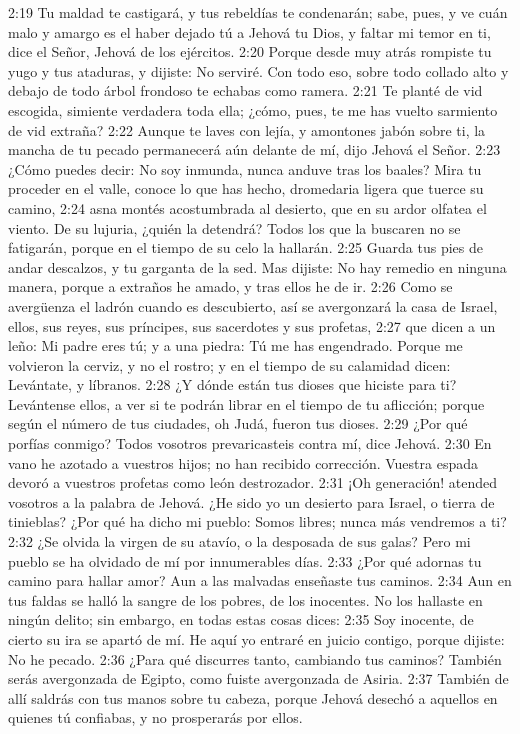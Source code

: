 2:19 Tu maldad te castigará, y tus rebeldías te condenarán; sabe, pues, y ve cuán malo y amargo es el haber dejado tú a Jehová tu Dios, y faltar mi temor en ti, dice el Señor, Jehová de los ejércitos.  
2:20 Porque desde muy atrás rompiste tu yugo y tus ataduras, y dijiste: No serviré. Con todo eso, sobre todo collado alto y debajo de todo árbol frondoso te echabas como ramera.  
2:21 Te planté de vid escogida, simiente verdadera toda ella; ¿cómo, pues, te me has vuelto sarmiento de vid extraña?  
2:22 Aunque te laves con lejía, y amontones jabón sobre ti, la mancha de tu pecado permanecerá aún delante de mí, dijo Jehová el Señor.  
2:23 ¿Cómo puedes decir: No soy inmunda, nunca anduve tras los baales? Mira tu proceder en el valle, conoce lo que has hecho, dromedaria ligera que tuerce su camino,  
2:24 asna montés acostumbrada al desierto, que en su ardor olfatea el viento. De su lujuria, ¿quién la detendrá? Todos los que la buscaren no se fatigarán, porque en el tiempo de su celo la hallarán.  
2:25 Guarda tus pies de andar descalzos, y tu garganta de la sed. Mas dijiste: No hay remedio en ninguna manera, porque a extraños he amado, y tras ellos he de ir.  
2:26 Como se avergüenza el ladrón cuando es descubierto, así se avergonzará la casa de Israel, ellos, sus reyes, sus príncipes, sus sacerdotes y sus profetas,  
2:27 que dicen a un leño: Mi padre eres tú; y a una piedra: Tú me has engendrado. Porque me volvieron la cerviz, y no el rostro; y en el tiempo de su calamidad dicen: Levántate, y líbranos.  
2:28 ¿Y dónde están tus dioses que hiciste para ti? Levántense ellos, a ver si te podrán librar en el tiempo de tu aflicción; porque según el número de tus ciudades, oh Judá, fueron tus dioses.  
2:29 ¿Por qué porfías conmigo? Todos vosotros prevaricasteis contra mí, dice Jehová.  
2:30 En vano he azotado a vuestros hijos; no han recibido corrección. Vuestra espada devoró a vuestros profetas como león destrozador.  
2:31 ¡Oh generación! atended vosotros a la palabra de Jehová. ¿He sido yo un desierto para Israel, o tierra de tinieblas? ¿Por qué ha dicho mi pueblo: Somos libres; nunca más vendremos a ti?  
2:32 ¿Se olvida la virgen de su atavío, o la desposada de sus galas? Pero mi pueblo se ha olvidado de mí por innumerables días.  
2:33 ¿Por qué adornas tu camino para hallar amor? Aun a las malvadas enseñaste tus caminos.  
2:34 Aun en tus faldas se halló la sangre de los pobres, de los inocentes. No los hallaste en ningún delito; sin embargo, en todas estas cosas dices:  
2:35 Soy inocente, de cierto su ira se apartó de mí. He aquí yo entraré en juicio contigo, porque dijiste: No he pecado.  
2:36 ¿Para qué discurres tanto, cambiando tus caminos? También serás avergonzada de Egipto, como fuiste avergonzada de Asiria.  
2:37 También de allí saldrás con tus manos sobre tu cabeza, porque Jehová desechó a aquellos en quienes tú confiabas, y no prosperarás por ellos.  

